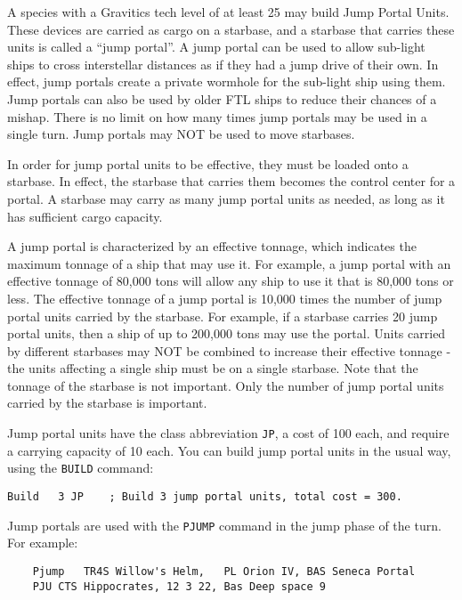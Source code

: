 \documentclass[10pt,titlepage]{article}
\begin{document}
A species with a Gravitics tech level of at least 25 may build Jump Portal
Units.  These devices are carried as cargo on a starbase, and a starbase that
carries these units is called a ``jump portal''.  A jump portal can be used to
allow sub-light ships to cross interstellar distances as if they had a jump
drive of their own.  In effect, jump portals create a private wormhole for the
sub-light ship using them.  Jump portals can also be used by older FTL ships
to reduce their chances of a mishap.  There is no limit on how many times jump
portals may be used in a single turn.  Jump portals may NOT be used to move
starbases.

In order for jump portal units to be effective, they must be loaded onto a
starbase.  In effect, the starbase that carries them becomes the control center
for a portal.  A starbase may carry as many jump portal units as needed, as
long as it has sufficient cargo capacity.

A jump portal is characterized by an effective tonnage, which indicates the
maximum tonnage of a ship that may use it.  For example, a jump portal with
an effective tonnage of 80,000 tons will allow any ship to use it that is
80,000 tons or less.  The effective tonnage of a jump portal is 10,000 times
the number of jump portal units carried by the starbase.  For example, if a
starbase carries 20 jump portal units, then a ship of up to 200,000 tons may
use the portal.  Units carried by different starbases may NOT be combined to
increase their effective tonnage - the units affecting a single ship must be
on a single starbase.  Note that the tonnage of the starbase is not important.
Only the number of jump portal units carried by the starbase is important.

Jump portal units have the class abbreviation \texttt{JP}, a cost of 100 each, and
require a carrying capacity of 10 each.  You can build jump portal units
in the usual way, using the \texttt{BUILD} command:

\begin{verbatim}
Build	3 JP	; Build 3 jump portal units, total cost = 300.	\end{verbatim} 

Jump portals are used with the \texttt{PJUMP} command in the jump phase of the turn.
For example:

\begin{verbatim}
	Pjump   TR4S Willow's Helm,   PL Orion IV, BAS Seneca Portal
	PJU	CTS Hippocrates, 12 3 22, Bas Deep space 9\end{verbatim} 
\end{document}

